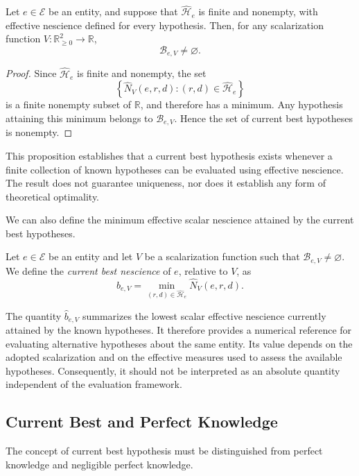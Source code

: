 \begin{proposition}
\label{prop:current_best_existence}
Let $e\in\mathcal E$ be an entity, and suppose that $\widehat{\mathcal H}_e$ is finite and nonempty, with effective nescience defined for every hypothesis. Then, for any scalarization function
$V:\mathbb R_{\geq0}^2\to\mathbb R$,
\[
\mathcal B_{e,V}\neq\varnothing.
\]
\end{proposition}
\begin{proof}
Since $\widehat{\mathcal H}_e$ is finite and nonempty, the set
\[
\left\{\widehat N_V(e,r,d): (r,d)\in\widehat{\mathcal H}_e \right\}
\]
is a finite nonempty subset of $\mathbb R$, and therefore has a minimum. Any hypothesis attaining this minimum belongs to $\mathcal B_{e,V}$. Hence the set of current best hypotheses is nonempty.
\end{proof}

This proposition establishes that a current best hypothesis exists whenever a finite collection of known hypotheses can be evaluated using effective nescience. The result does not guarantee uniqueness, nor does it establish any form of theoretical optimality.

We can also define the minimum effective scalar nescience attained by the current best hypotheses.

\begin{definition}
Let $e\in\mathcal E$ be an entity and let $V$ be a scalarization function such that $\mathcal B_{e,V}\neq\varnothing$. We define the \emph{current best nescience}  of $e$, relative to $V$, as
\[
\widehat b_{e,V} = \min_{(r,d)\in\widehat{\mathcal H}_e} \widehat N_V(e,r,d).
\]
\end{definition}

The quantity $\widehat b_{e,V}$ summarizes the lowest scalar effective nescience currently attained by the
known hypotheses. It therefore provides a numerical reference for evaluating alternative hypotheses about the same entity. Its value depends on the adopted scalarization and on the effective measures used to assess the
available hypotheses. Consequently, it should not be interpreted as an absolute quantity independent of the evaluation framework.

\subsection*{Current Best and Perfect Knowledge}

The concept of current best hypothesis must be distinguished from perfect knowledge and negligible perfect knowledge.

